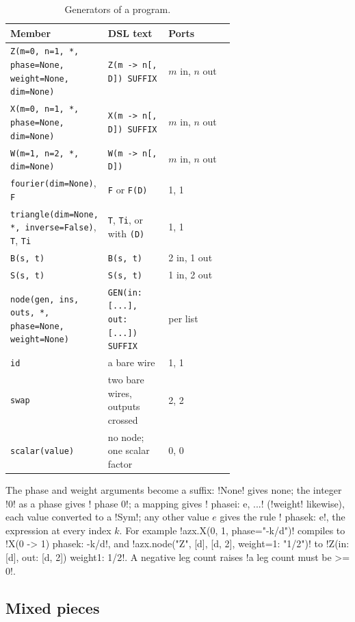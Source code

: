 \begin{table}[H]
\centering\small
\begin{tabularx}{\linewidth}{@{}>{\raggedright\arraybackslash}p{0.38\linewidth}>{\raggedright\arraybackslash}p{0.27\linewidth}X@{}}
\toprule
Member & DSL text & Ports \\
\midrule
\texttt{Z(m=0, n=1, *, phase=None, weight=None, dim=None)} & \texttt{Z(m -> n[, D]) SUFFIX} & $m$ in, $n$ out \\
\texttt{X(m=0, n=1, *, phase=None, dim=None)} & \texttt{X(m -> n[, D]) SUFFIX} & $m$ in, $n$ out \\
\texttt{W(m=1, n=2, *, dim=None)} & \texttt{W(m -> n[, D])} & $m$ in, $n$ out \\
\texttt{fourier(dim=None)}, \texttt{F} & \texttt{F} or \texttt{F(D)} & 1, 1 \\
\texttt{triangle(dim=None, *, inverse=False)}, \texttt{T}, \texttt{Ti} & \texttt{T}, \texttt{Ti}, or with \texttt{(D)} & 1, 1 \\
\texttt{B(s, t)} & \texttt{B(s, t)} & 2 in, 1 out \\
\texttt{S(s, t)} & \texttt{S(s, t)} & 1 in, 2 out \\
\texttt{node(gen, ins, outs, *, phase=None, weight=None)} & \texttt{GEN(in: [...], out: [...]) SUFFIX} & per list \\
\texttt{id} & a bare wire & 1, 1 \\
\texttt{swap} & two bare wires, outputs crossed & 2, 2 \\
\texttt{scalar(value)} & no node; one scalar factor & 0, 0 \\
\bottomrule
\end{tabularx}
\caption{Generators of a program.}
\label{tab:python-api-generators}
\end{table}

The phase and weight arguments become a suffix: \py!None! gives none; the integer \py!0! as a phase gives \code! phase 0!; a mapping gives \code! phase{i: e, ...}! (\code!weight! likewise), each value converted to a \py!Sym!; any other value $e$ gives the rule \code! phase{k: e}!, the expression at every index $k$. For example \code!azx.X(0, 1, phase="-k/d")! compiles to \code!X(0 -> 1) phase{k: -k/d}!, and \code!azx.node("Z", [d], [d, 2], weight={1: "1/2"})! to \code!Z(in: [d], out: [d, 2]) weight{1: 1/2}!. A negative leg count raises \code!a leg count must be >= 0!.

\subsection{Mixed pieces}

